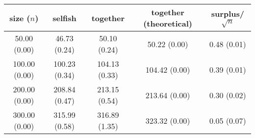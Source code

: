 \begin{center}
\begin{tabular}{c | c | c | c | c}
size ($n$) & selfish & together & together (theoretical) & surplus/$\sqrt{n}$\\ \hline
50.00 (0.00) & 46.73 (0.24) & 50.10 (0.24) & 50.22 (0.00) & 0.48 (0.01) \\
100.00 (0.00) & 100.23 (0.34) & 104.13 (0.33) & 104.42 (0.00) & 0.39 (0.01) \\
200.00 (0.00) & 208.84 (0.47) & 213.15 (0.54) & 213.64 (0.00) & 0.30 (0.02) \\
300.00 (0.00) & 315.99 (0.58) & 316.89 (1.35) & 323.32 (0.00) & 0.05 (0.07) \\
\end{tabular}
\end{center}
